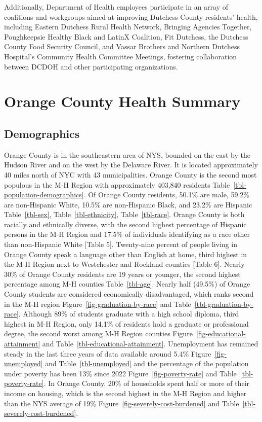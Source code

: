 \documentclass[
  english,
  letterpaper,
]{report}
\begin{document}
Additionally, Department of Health employees participate in an array of
coalitions and workgroups aimed at improving Dutchess County residents'
health, including Eastern Dutchess Rural Health Network, Bringing
Agencies Together, Poughkeepsie Healthy Black and LatinX Coalition, Fit
Dutchess, the Dutchess County Food Security Council, and Vassar Brothers
and Northern Dutchess Hospital's Community Health Committee Meetings,
fostering collaboration between DCDOH and other participating
organizations.

\section{Orange County Health
Summary}\label{orange-county-health-summary}

\subsection{Demographics}\label{demographics-1}

Orange County is in the southeastern area of NYS, bounded on the east by
the Hudson River and on the west by the Delaware River. It is located
approximately 40 miles north of NYC with 43 municipalities. Orange
County is the second most populous in the M-H Region with approximately
403,840 residents Table~\ref{tbl-population-demographics}. Of Orange
County residents, 50.1\% are male, 59.2\% are non-Hispanic White, 10.5\%
are non-Hispanic Black, and 23.2\% are Hispanic Table~\ref{tbl-sex},
Table~\ref{tbl-ethnicity}, Table~\ref{tbl-race}. Orange County is both
racially and ethnically diverse, with the second highest percentage of
Hispanic persons in the M-H Region and 17.5\% of individuals identifying
as a race other than non-Hispanic White {[}Table 5{]}. Twenty-nine
percent of people living in Orange County speak a language other than
English at home, third highest in the M-H Region next to Westchester and
Rockland counties {[}Table 6{]}. Nearly 30\% of Orange County residents
are 19 years or younger, the second highest percentage among M-H
counties Table~\ref{tbl-age}. Nearly half (49.5\%) of Orange County
students are considered economically disadvantaged, which ranks second
in the M-H region Figure~\ref{fig-graduation-by-race} and
Table~\ref{tbl-graduation-by-race}. Although 89\% of students graduate
with a high school diploma, third highest in M-H Region, only 14.1\% of
residents hold a graduate or professional degree, the second worst among
M-H Region counties Figure~\ref{fig-educational-attainment} and
Table~\ref{tbl-educational-attainment}. Unemployment has remained steady
in the last three years of data available around 5.4\%
Figure~\ref{fig-unemployed} and Table~\ref{tbl-unemployed} and the
percentage of the population under poverty has been 13\% since 2022
Figure~\ref{fig-poverty-rate} and Table~\ref{tbl-poverty-rate}. In
Orange County, 20\% of households spent half or more of their income on
housing, which is the second highest in the M-H Region and higher than
the NYS average of 19\% Figure~\ref{fig-severely-cost-burdened} and
Table~\ref{tbl-severely-cost-burdened}.
\end{document}
